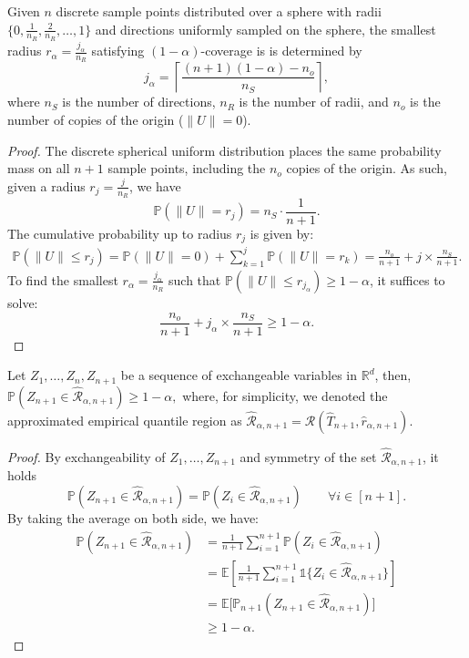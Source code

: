 \begin{proposition}
Given $n$ discrete sample points distributed over a sphere with radii $\{0, \frac{1}{n_R}, \frac{2}{n_R}, \ldots, 1\}$ and directions uniformly sampled on the sphere, the smallest radius $r_\alpha = \frac{j_\alpha}{n_R}$ satisfying $(1-\alpha)$-coverage is
is determined by 
$$
j_\alpha = \left\lceil \frac{(n+1) (1 - \alpha) - n_o}{n_S} \right\rceil,
$$
where $n_S$ is the number of directions, $n_R$ is the number of radii, and $n_o$ is the number of copies of the origin ($\|U\| = 0$).
\end{proposition}

\begin{proof}
The discrete spherical uniform distribution places the same probability mass on all $n+1$ sample points, including the $n_o$ copies of the origin. As such, given a radius $r_j = \frac{j}{n_R}$, we have
$$
\mathbb{P}(\|U\| = r_j) = n_S \cdot \frac{1}{n+1}.
$$
The cumulative probability up to radius $r_j$ is given by:
\begin{align*}
\mathbb{P}(\|U\| \leq r_j) = \mathbb{P}(\|U\| = 0) + \sum_{k=1}^j \mathbb{P}(\|U\| = r_k) 
= \frac{n_o}{n+1} + j \times \frac{n_S}{n+1}.
\end{align*}
To find the smallest $r_\alpha = \frac{j_\alpha}{n_R}$ such that $\mathbb{P}(\|U\| \leq r_{j_\alpha}) \geq 1 - \alpha$, it suffices to solve:
$$
\frac{n_o}{n+1} + j_\alpha \times \frac{n_S}{n+1} \geq 1 - \alpha.
$$
\end{proof}


\begin{lemma}
Let $Z_1, \ldots, Z_n, Z_{n+1}$ be a sequence of exchangeable variables in $\mathbb{R}^d$, then,
$
   \mathbb{P}(Z_{n+1} \in \widehat {\mathcal{R}}_{\alpha, n+1}) \geq 1-\alpha,
$
where, for simplicity, we denoted the approximated empirical quantile region as $\widehat {\mathcal{R}}_{\alpha, n+1} = \mathcal{R}(\hat T_{n+1}, \hat r_{\alpha, n+1})$. 
\end{lemma}
 
\begin{proof}
By exchangeability of $Z_1, \ldots, Z_{n+1}$ and symmetry of the set $\widehat{\mathcal{R}}_{\alpha, n+1}$, it holds
$$
    \mathbb{P}(Z_{n+1} \in \widehat{\mathcal{R}}_{\alpha, n+1}) = \mathbb{P}(Z_{i} \in \widehat{\mathcal{R}}_{\alpha, n+1}) \qquad \forall i \in [n+1].
$$
By taking the average on both side, we have: 
\begin{align*}
    \mathbb{P}(Z_{n+1} \in \widehat{\mathcal{R}}_{\alpha, n+1}) &= \frac{1}{n+1}\sum_{i=1}^{n+1} \mathbb{P}(Z_{i} \in \widehat{\mathcal{R}}_{\alpha, n+1}) \\
    &= \mathbb{E} \left[ \frac{1}{n+1}\sum_{i=1}^{n+1} \mathds{1}\{Z_i \in \widehat{\mathcal{R}}_{\alpha, n+1}\}  \right] \\
    &= \mathbb{E} \bigg[ \mathbb{P}_{n+1}(Z_{n+1} \in \widehat{\mathcal{R}}_{\alpha, n+1}) \bigg]  \\
    &\geq 1 - \alpha.
\end{align*}
\end{proof}


